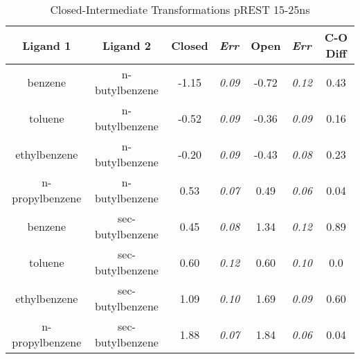 \documentclass[T4paper.tex]{subfiles}
\begin{document}
\begin{table}[!htb]
\centering
\caption{Closed-Intermediate Transformations pREST 15-25ns}
\label{tbl:C-I_pRESText}
\begin{tabular}{|c|c|c|l|c|l|c|}
\hline
\textbf{Ligand 1}                       & \textbf{Ligand 2}                        & {\color[HTML]{800080} \textbf{Closed}} & {\color[HTML]{800080} \textit{Err}} & {\color[HTML]{008000} \textbf{Open}} & {\color[HTML]{008000} \textit{Err}} & \textbf{C-O Diff}            \\ \hline
\cellcolor[HTML]{800080}benzene         & \cellcolor[HTML]{00FFFF}n-butylbenzene   & -1.15                                   & \textit{0.09}                       & -0.72                                & \textit{0.12}                       & \cellcolor[HTML]{FFCCC9}0.43 \\ \hline
\cellcolor[HTML]{800080}toluene         & \cellcolor[HTML]{00FFFF}n-butylbenzene   & -0.52                                  & \textit{0.09}                       & -0.36                                & \textit{0.09}                       & \cellcolor[HTML]{9AFF99}0.16 \\ \hline
\cellcolor[HTML]{800080}ethylbenzene    & \cellcolor[HTML]{00FFFF}n-butylbenzene   & -0.20                                   & \textit{0.09}                       & -0.43                                & \textit{0.08}                       & \cellcolor[HTML]{9AFF99}0.23 \\ \hline
\cellcolor[HTML]{800080}n-propylbenzene & \cellcolor[HTML]{00FFFF}n-butylbenzene   & 0.53                                  & \textit{0.07}                       & 0.49                                 & \textit{0.06}                       & \cellcolor[HTML]{9AFF99}0.04 \\ \hline
\cellcolor[HTML]{800080}benzene         & \cellcolor[HTML]{00FFFF}sec-butylbenzene & 0.45                                   & \textit{0.08}                       & 1.34                                 & \textit{0.12}                       & \cellcolor[HTML]{9AFF99}0.89 \\ \hline
\cellcolor[HTML]{800080}toluene         & \cellcolor[HTML]{00FFFF}sec-butylbenzene & 0.60                                   & \textit{0.12}                       & 0.60                                 & \textit{0.10}                       & \cellcolor[HTML]{9AFF99}0.0 \\ \hline
\cellcolor[HTML]{800080}ethylbenzene    & \cellcolor[HTML]{00FFFF}sec-butylbenzene & 1.09                                   & \textit{0.10}                       & 1.69                                 & \textit{0.09}                       & \cellcolor[HTML]{9AFF99}0.60 \\ \hline
\cellcolor[HTML]{800080}n-propylbenzene & \cellcolor[HTML]{00FFFF}sec-butylbenzene & 1.88                                   & \textit{0.07}                       & 1.84                                 & \textit{0.06}                       & \cellcolor[HTML]{9AFF99}0.04 \\ \hline
\end{tabular}
\end{table}
\end{document}
